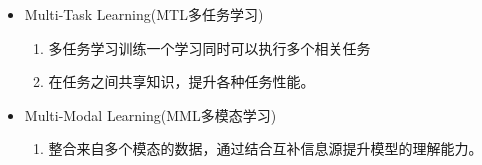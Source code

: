 \documentclass[UTF8]{ctexart}
\begin{document}
\begin{itemize}
    \begin{enumerate}
        \item closed-domain(封闭领域)：在一个特定主题领域内回答问题
        \item Open-domain(开放领域)：可以回答广泛主题的问题
        \item Retrieval-based基于检索(extractive抽取式)：查找相关的文档或段落并且抽取答案
        \item Generative Model生成式模型(abstractive)：使用神经网络模型直接从知识中生成答案。(神经网络通过大规模的训练参数，就是学习到的内化知识)
    \end{enumerate}

    \item Multi-Task Learning(MTL多任务学习)
    
    \begin{enumerate}
        \item 多任务学习训练一个学习同时可以执行多个相关任务
        \item 在任务之间共享知识，提升各种任务性能。
    \end{enumerate}
    \item Multi-Modal Learning(MML多模态学习)
    \begin{enumerate}
        \item 整合来自多个模态的数据，通过结合互补信息源提升模型的理解能力。
    \end{enumerate}

\end{itemize}
\end{document}
